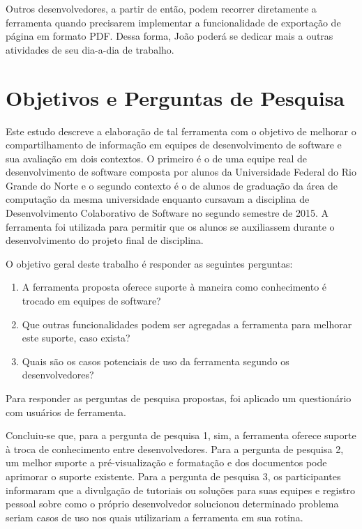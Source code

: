 Outros desenvolvedores, a partir de então, podem recorrer diretamente a ferramenta quando precisarem implementar a funcionalidade de exportação de página em formato PDF. Dessa forma, João poderá se dedicar mais a outras atividades de seu dia-a-dia de trabalho.

\section{Objetivos e Perguntas de Pesquisa}

Este estudo descreve a elaboração de tal ferramenta com o objetivo de melhorar o compartilhamento de informação em equipes de desenvolvimento de software e sua avaliação em dois contextos. O primeiro é o de uma equipe real de desenvolvimento de software composta por alunos da Universidade Federal do Rio Grande do Norte e o segundo contexto é o de alunos de graduação da área de computação da mesma universidade enquanto cursavam a disciplina de Desenvolvimento Colaborativo de Software no segundo semestre de 2015. A ferramenta foi utilizada para permitir que os alunos se auxiliassem durante o desenvolvimento do projeto final de disciplina.

O objetivo geral deste trabalho é responder as seguintes perguntas:

\begin{enumerate}
  \item A ferramenta proposta oferece suporte à maneira como conhecimento é trocado em equipes de software?
  \item Que outras funcionalidades podem ser agregadas a ferramenta para melhorar este suporte, caso exista?
  \item Quais são os casos potenciais de uso da ferramenta segundo os desenvolvedores?
\end{enumerate}

Para responder as perguntas de pesquisa propostas, foi aplicado um questionário com usuários de ferramenta.

Concluiu-se que, para a pergunta de pesquisa 1, sim, a ferramenta oferece suporte à troca de conhecimento entre desenvolvedores. Para a pergunta de pesquisa 2, um melhor suporte a pré-visualização e formatação e dos documentos pode aprimorar o suporte existente. Para a pergunta de pesquisa 3, os participantes informaram que a divulgação de tutoriais ou soluções para suas equipes e registro pessoal sobre como o próprio desenvolvedor solucionou determinado problema seriam casos de uso nos quais utilizariam a ferramenta em sua rotina.

